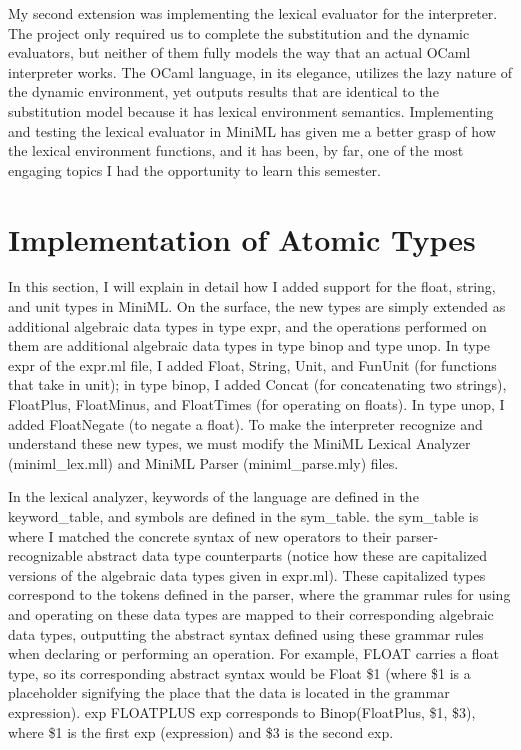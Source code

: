 \documentclass[12pt]{article}
\begin{document}
My second extension was implementing the lexical evaluator for the interpreter. The project only required us to complete the substitution and the dynamic evaluators, but neither of them fully models the way that an actual OCaml interpreter works. The OCaml language, in its elegance, utilizes the lazy nature of the dynamic environment, yet outputs results that are identical to the substitution model because it has lexical environment semantics. Implementing and testing the lexical evaluator in MiniML has given me a better grasp of how the lexical environment functions, and it has been, by far, one of the most engaging topics I had the opportunity to learn this semester. 


\pagebreak
\section{Implementation of Atomic Types}

In this section, I will explain in detail how I added support for the float, string, and unit types in MiniML. On the surface, the new types are simply extended as additional algebraic data types in type expr, and the operations performed on them are additional algebraic data types in type binop and type unop. In type expr of the expr.ml file, I added Float, String, Unit, and FunUnit (for functions that take in unit); in type binop, I added Concat (for concatenating two strings), FloatPlus, FloatMinus, and FloatTimes (for operating on floats). In type unop, I added FloatNegate (to negate a float). To make the interpreter recognize and understand these new types, we must modify the MiniML Lexical Analyzer (miniml\_lex.mll) and MiniML Parser (miniml\_parse.mly) files. 


In the lexical analyzer, keywords of the language are defined in the keyword\_table, and symbols are defined in the sym\_table. the sym\_table is where I matched the concrete syntax of new operators to their parser-recognizable abstract data type counterparts (notice how these are capitalized versions of the algebraic data types given in expr.ml). These capitalized types correspond to the tokens defined in the parser, where the grammar rules for using and operating on these data types are mapped to their corresponding algebraic data types, outputting the abstract syntax defined using these grammar rules when declaring or performing an operation. For example, FLOAT carries a float type, so its corresponding abstract syntax would be Float \$1 (where \$1 is a placeholder signifying the place that the data is located in the grammar expression). exp FLOATPLUS exp corresponds to Binop(FloatPlus, \$1, \$3), where \$1 is the first exp (expression) and \$3 is the second exp. 
\end{document}
